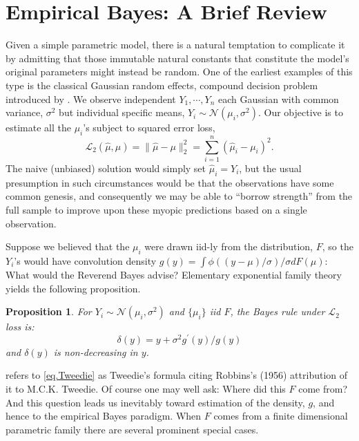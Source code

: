 \documentclass[12pt]{amsart}
\def\LL{\mathcal L}
\def\NN{\mathcal N}
\def\LL{\mathcal L}
\newtheorem{proposition}{Proposition}
\begin{document}
\section{Empirical Bayes:  A Brief Review}

Given a simple parametric model, there is a natural temptation
to complicate it by admitting that those immutable natural constants that
constitute the model's original parameters might instead be random.  One of the
earliest examples of this type is the classical Gaussian random effects,
compound decision problem introduced by .  We observe
independent $Y_1, \cdots , Y_n$ each Gaussian with common variance, $\sigma^2$
but individual specific means, $Y_i \sim \NN (\mu_i , \sigma^2)$.  Our 
objective is to estimate all the $\mu_i$'s subject to squared error loss,
\[
\LL_2 (\hat \mu , \mu ) = \| \hat \mu - \mu \|_2^2 = 
\sum_{i=1}^n (\hat \mu_i - \mu_i)^2.
\]
The naive (unbiased) solution would simply set $\hat \mu_i = Y_i$,
but the usual presumption in such circumstances would be that the observations
have some common genesis, and consequently we may be able to ``borrow
strength''  from the full sample to improve upon these myopic predictions
based on a single observation.

Suppose we believed that the $\mu_i$ were drawn
iid-ly from the distribution, $F$, so the $Y_i$'s would have convolution
density $g(y) = \int \phi ((y - \mu)/\sigma)/\sigma dF(\mu)$:  What would
the Reverend Bayes advise?  Elementary exponential family theory yields
the following proposition.  

\begin{proposition}
	For $Y_i \sim \NN(\mu_i , \sigma^2)$ and $\{ \mu_i \}$ iid $F$,
	the Bayes rule under $\LL_2$ loss is:
	\begin{equation}
	\delta(y) = y + \sigma^2 g^\prime (y) / g(y)
	\label{eq.Tweedie}
	\end{equation}
	and $\delta (y)$ is non-decreasing in $y$.
\end{proposition}
 refers to  \eqref{eq.Tweedie} as Tweedie's formula
citing Robbins's (1956) \nocite{Robbins.56} attribution of it to M.C.K.
Tweedie.  Of course one may well ask:  Where did this $F$ come from?  And
this question leads us inevitably toward estimation of the density, $g$, and 
hence to the empirical Bayes paradigm.  When $F$ comes from a finite 
dimensional parametric family there are several prominent special cases.
\end{document}
